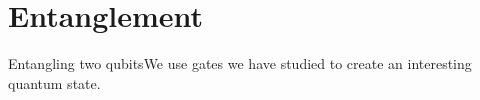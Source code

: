 \section{Entanglement}

\begin{frame}{Entangling two qubits}{We use gates we have studied to create an interesting quantum state.}

\end{frame}
